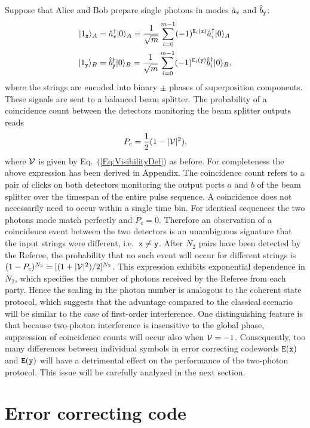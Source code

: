 \documentclass[10pt]{article}
\newcommand{\ket}[2][]{{|#2\rangle_{#1}}}
\begin{document}
Suppose that Alice and Bob prepare single photons in modes $\hat{a}_{\tt x}$ and $\hat{b}_{\tt y}$:
\begin{align}
\ket[A]{1_{\tt x}} & = \hat{a}^\dagger_{\tt x} \ket[A]{0} = \frac{1}{\sqrt{m}}\sum_{i=0}^{m-1} (-1)^{{\tt E}_i({\tt x})} \hat{a}_i^\dagger \ket[A]{0} \nonumber \\
\ket[B]{1_{\tt y}} & = \hat{b}^\dagger_{\tt y} \ket[B]{0} = \frac{1}{\sqrt{m}}\sum_{i=0}^{m-1} (-1)^{{\tt E}_i({\tt y})} \hat{b}_i^\dagger \ket[B]{0},
\end{align}
where the strings are encoded into binary $\pm$ phases of superposition components. These signals are sent to a balanced beam splitter.
The probability of a coincidence count between the detectors monitoring the beam splitter outputs reads \cite{Loudon}
\begin{equation}
P_c = \frac{1}{2} (1-|{\cal V}|^2),
\label{Eq:Pcdef}
\end{equation}
where ${\cal V}$ is given by Eq.~(\ref{Eq:VisibilityDef}) as before. For completeness the above expression has been derived in Appendix. The coincidence count refers to a pair of clicks on both detectors monitoring the output ports $a$ and $b$ of the beam splitter over the timespan of the entire pulse sequence.
A coincidence does not necessarily need to occur within a single time bin. For identical sequences the two photons mode match perfectly and $P_c=0$. Therefore an observation of a coincidence event between the two detectors is an unambiguous signature that the input strings were different, i.e.\ ${\tt x} \neq {\tt y}$. After $N_2$ pairs have been detected by the Referee, the probability that no such event will occur for different strings is $(1-P_c)^{N_2}=[(1+|{\cal V}|^2)/2]^{N_2}$. This expression exhibits exponential dependence in $N_2$, which specifies the number of photons received by the Referee from each party. Hence the scaling in the photon number is analogous to the coherent state protocol, which suggests that the advantage compared to the classical scenario will be similar to the case of first-order interference.
One distinguishing feature is that because two-photon interference is insensitive to the global phase, suppression of coincidence counts will occur also when ${\cal V} = -1$. Consequently, too many differences between individual symbols in error correcting codewords ${\tt E}({\tt x})$ and ${\tt E}({\tt y})$ will have a detrimental effect on the performance of the two-photon protocol. This issue will be carefully analyzed in the next section.
\section{Error correcting code}
\label{Sec:ECC}
\end{document}
